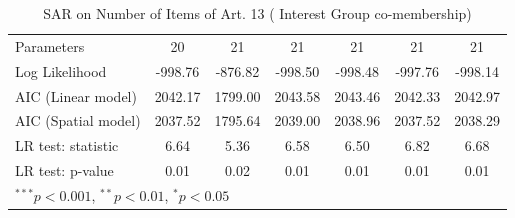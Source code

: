 \begin{table}[!h]
\begin{center}
\begin{tabular}{l c c c c c c }
Parameters              & 20           & 21           & 21           & 21           & 21           & 21           \\
Log Likelihood          & -998.76      & -876.82      & -998.50      & -998.48      & -997.76      & -998.14      \\
AIC (Linear model)      & 2042.17      & 1799.00      & 2043.58      & 2043.46      & 2042.33      & 2042.97      \\
AIC (Spatial model)     & 2037.52      & 1795.64      & 2039.00      & 2038.96      & 2037.52      & 2038.29      \\
LR test: statistic      & 6.64         & 5.36         & 6.58         & 6.50         & 6.82         & 6.68         \\
LR test: p-value        & 0.01         & 0.02         & 0.01         & 0.01         & 0.01         & 0.01         \\
\bottomrule
\multicolumn{7}{l}{\scriptsize{$^{***}p<0.001$, $^{**}p<0.01$, $^*p<0.05$}}
\end{tabular}
\caption{SAR on Number of Items of Art. 13 ( Interest Group co-membership)}
\label{table:coefficients}
\end{center}
\end{table}
